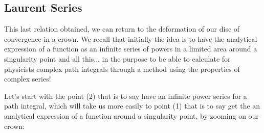 	\pagebreak
	\subsection{Laurent Series}
	This last relation obtained, we can return to the deformation of our disc of convergence in a crown. We recall that initially the idea is to have the analytical expression of a function as an infinite series of powers in a limited area around a singularity point and all this... in the purpose to be able to calculate for physicists complex path integrals through a method using the properties of complex series!
	
	Let's start with the point (2) that is to say have an infinite power series for a path integral, which will take us more easily to point (1) that is to say get the an analytical expression of a function around a singularity point, by zooming on our crown:
